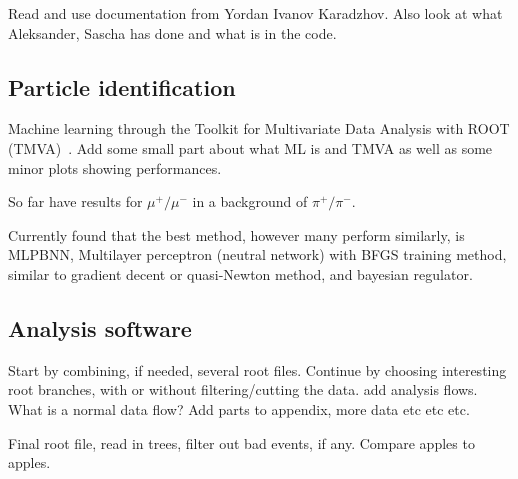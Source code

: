 Read and use documentation from Yordan Ivanov Karadzhov. Also look at what Aleksander, Sascha has done and what is in the code.


\subsection{Particle identification}
Machine learning through the Toolkit for Multivariate Data Analysis with ROOT (TMVA)~\cite{TMVA}. Add some small part about what ML is and TMVA as well as some minor plots showing performances.

So far have results for $\mu^+/\mu^-$ in a background of  $\pi^+/\pi^-$.

Currently found that the best method, however many perform similarly, is MLPBNN, Multilayer perceptron (neutral network) with BFGS training method, similar to gradient decent or quasi-Newton method, and bayesian regulator.

\subsection{Analysis software}
Start by combining, if needed, several root files. Continue by choosing interesting root branches, with or without filtering/cutting the data.
add analysis flows. What is a normal data flow? Add parts to appendix, more data etc etc etc.

Final root file, read in trees, filter out bad events, if any. Compare apples to apples. 

